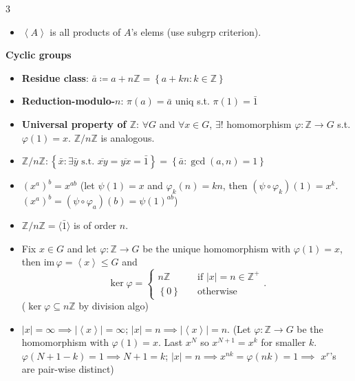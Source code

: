 \documentclass[10pt]{article}
\newcommand{\Z}{\mathbb{Z}} %
\newcommand{\abs}[1]{\left\lvert#1\right\rvert} %
\begin{document}
\begin{multicols*}{3}
\begin{itemize}
            \item $\left\langle A \right\rangle$ is all products of $A$'s elems (use subgrp criterion).
        \end{itemize}
        \textbf{Cyclic groups}
        \begin{itemize}
            \setlength\itemsep{2pt}
            \item \textbf{Residue class}: $\bar{a} \coloneqq a + n\Z = \left\{a + kn \colon k \in \Z\right\}$
            \item \textbf{Reduction-modulo-$n$}: $\pi\left(a\right) = \bar{a}$ uniq s.t. $\pi\left(1\right) = \bar{1}$
            \item \textbf{Universal property of $\Z$}: $\forall G$ and $\forall x \in G$, $\exists!$ homomorphism $\varphi \colon \Z \to G$ s.t. $\varphi\left(1\right) = x$. $\Z \slash n\Z$ is analogous.
            \item $\Z \slash n\Z \colon \left\{\bar{x} \colon \exists \bar{y} \textrm{ s.t. } \overline{xy} = \overline{yx} = \bar{1}\right\} = \left\{\bar{a} \colon \gcd\left(a, n\right) = 1\right\}$
            \item $\left(x^a\right)^b = x^{ab}$ (let $\psi\left(1\right) = x$ and $\varphi_k\left(n\right) = kn$, then $\left(\psi \circ \varphi_k\right)\left(1\right) = x^k$. $\left(x^a\right)^b = \left(\psi \circ \varphi_a\right)\left(b\right) = \psi\left(1\right)^{ab}$)
            \item $\Z \slash n\Z = \langle\bar{1}\rangle$ is of order $n$.
            \item Fix $x \in G$ and let $\varphi \colon \Z \to G$ be the unique homomorphism with $\varphi\left(1\right) = x$, then $\mathrm{im}\,{\varphi} = \left\langle x \right\rangle \leq G$ and 
            \begin{equation*}
                \ker{\varphi} = \begin{cases}
                    n\Z & \quad\textrm{if } \abs{x} = n \in \Z^+ \\
                    \left\{0\right\} & \quad\textrm{otherwise}
                \end{cases}.
            \end{equation*}
            ($\ker{\varphi} \subseteq n\Z$ by division algo)
            \item $\abs{x} = \infty \implies\abs{\left\langle x \right\rangle} = \infty$; $\abs{x} = n \implies \abs{\left\langle x \right\rangle} = n$. (Let $\varphi \colon \Z \to G$ be the homomorphism with $\varphi\left(1\right) = x$. Last $x^N$ so $x^{N + 1} = x^k$ for smaller $k$. $\varphi\left(N + 1 - k\right) = 1 \implies N + 1 = k$; $\abs{x} = n \implies x^{nk} = \varphi\left(nk\right) = 1 \implies$ $x^r$'s are pair-wise distinct)

\end{itemize}
\end{multicols*}
\end{document}
